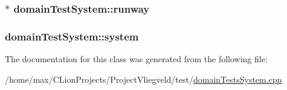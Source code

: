 \subsubsection[{\texorpdfstring{runway}{runway}}]{$\ast$ domain\+Test\+System\+::runway\hspace{0.3cm}{\ttfamily [protected]}}\hypertarget{classdomainTestSystem_aff348e2b0204535147979a4af0f1953d}{}\label{classdomainTestSystem_aff348e2b0204535147979a4af0f1953d}
\subsubsection[{\texorpdfstring{system}{system}}]{ domain\+Test\+System\+::system\hspace{0.3cm}{\ttfamily [protected]}}\hypertarget{classdomainTestSystem_a56da545e95cc6b6606ec94857adc14eb}{}\label{classdomainTestSystem_a56da545e95cc6b6606ec94857adc14eb}


The documentation for this class was generated from the following file\+:\begin{DoxyCompactItemize}
\item 
/home/max/\+C\+Lion\+Projects/\+Project\+Vliegveld/test/\hyperlink{domainTestsSystem_8cpp}{domain\+Tests\+System.\+cpp}\end{DoxyCompactItemize}
